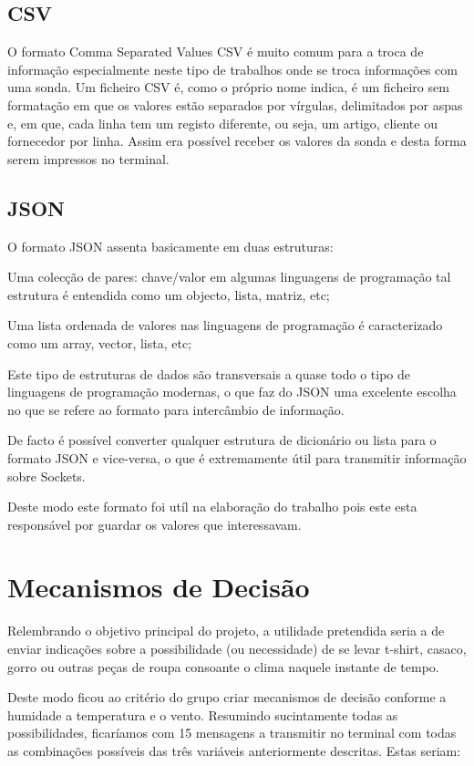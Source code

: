 \documentclass[a4paper,12pt]{report}
\begin{document}
\subsection{CSV}
O formato Comma Separated Values CSV é muito comum para a troca de informação especialmente neste tipo de trabalhos onde se troca informações com uma sonda. Um ficheiro CSV é, como o próprio nome indica, é um ficheiro sem formatação em que os valores estão separados por vírgulas, delimitados por aspas e, em que, cada linha tem um registo diferente, ou seja, um artigo, cliente ou fornecedor por linha.
Assim era possível receber os valores da sonda e desta forma serem impressos no terminal.

\subsection{JSON}
O formato JSON assenta basicamente em duas estruturas:\par 
Uma colecção de pares: chave/valor em algumas linguagens de programação tal estrutura é entendida como um objecto, lista, matriz, etc;\par 
Uma lista ordenada de valores nas linguagens de programação é caracterizado como um array, vector, lista, etc;\par
Este tipo de estruturas de dados são transversais a quase todo o tipo de linguagens de programação modernas, o que faz do JSON uma excelente escolha no que se refere ao formato para intercâmbio de informação.\par
De facto é possível converter qualquer estrutura de dicionário ou lista para o formato JSON e vice-versa, o que é extremamente útil para transmitir informação sobre Sockets.\par

Deste modo este formato foi utíl na elaboração do trabalho pois este esta responsável por guardar os valores que interessavam.
\clearpage

\section{Mecanismos de Decisão}
Relembrando o objetivo principal do projeto,  a utilidade pretendida seria a de enviar indicações sobre a possibilidade (ou necessidade) de se levar t-shirt, casaco, gorro ou outras peças de roupa consoante o clima naquele instante de tempo.\par
Deste modo ficou ao critério do grupo criar mecanismos de decisão conforme a humidade a temperatura e o vento. Resumindo sucintamente todas as possibilidades, ficaríamos com 15 mensagens a transmitir no terminal com todas as combinações possíveis das três variáveis anteriormente descritas. Estas seriam:
\end{document}
